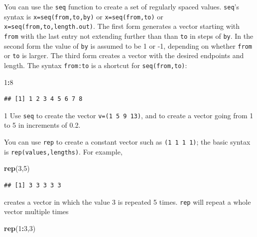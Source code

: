 \documentclass[11pt,]{article}
\newenvironment{Shaded}{\begin{snugshade}}{\end{snugshade}}
\newcommand{\DecValTok}[1]{\textcolor[rgb]{0.00,0.00,0.81}{#1}}
\newcommand{\KeywordTok}[1]{\textcolor[rgb]{0.13,0.29,0.53}{\textbf{#1}}}
\newcommand{\NormalTok}[1]{#1}
\newcommand{\OperatorTok}[1]{\textcolor[rgb]{0.81,0.36,0.00}{\textbf{#1}}}
\let\BeginKnitrBlock\begin \let\EndKnitrBlock\end
\begin{document}
You can use the \texttt{seq} function to create a set of regularly spaced values. \texttt{seq}'s syntax is \texttt{x=seq(from,to,by)} or \texttt{x=seq(from,to)} or \texttt{x=seq(from,to,length.out)}.
The first form generates a vector starting with \texttt{from} with the last entry not extending further than than \texttt{to} in steps of \texttt{by}. In the second form the value of \texttt{by} is assumed to be 1 or -1, depending on
whether \texttt{from} or \texttt{to} is larger. The third form creates a vector with the desired endpoints and length. The syntax \texttt{from:to} is a shortcut for \texttt{seq(from,to)}:

\begin{Shaded}
\begin{Highlighting}[]
\DecValTok{1}\OperatorTok{:}\DecValTok{8}
\end{Highlighting}
\end{Shaded}

\begin{verbatim}
## [1] 1 2 3 4 5 6 7 8
\end{verbatim}

\BeginKnitrBlock{exercisebox}{1}
Use \texttt{seq} to create the vector \texttt{v=(1\ 5\ 9\ 13)}, and to create a vector going from 1 to 5 in increments of 0.2.
\EndKnitrBlock{exercisebox}

You can use \texttt{rep} to create a constant vector such as \texttt{(1\ 1\ 1\ 1)}; the basic syntax is \texttt{rep(values,lengths)}. For example,

\begin{Shaded}
\begin{Highlighting}[]
\KeywordTok{rep}\NormalTok{(}\DecValTok{3}\NormalTok{,}\DecValTok{5}\NormalTok{)}
\end{Highlighting}
\end{Shaded}

\begin{verbatim}
## [1] 3 3 3 3 3
\end{verbatim}

creates a vector in which the value 3 is repeated 5 times. \texttt{rep} will repeat a whole vector multiple times

\begin{Shaded}
\begin{Highlighting}[]
\KeywordTok{rep}\NormalTok{(}\DecValTok{1}\OperatorTok{:}\DecValTok{3}\NormalTok{,}\DecValTok{3}\NormalTok{)}
\end{Highlighting}
\end{Shaded}
\end{document}

